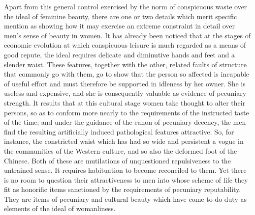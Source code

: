 \documentclass[12pt]{report}
\begin{document}
Apart from this general control exercised by the norm of conspicuous
waste over the ideal of feminine beauty, there are one or two details
which merit specific mention as showing how it may exercise an extreme
constraint in detail over men's sense of beauty in women. It has
already been noticed that at the stages of economic evolution at which
conspicuous leisure is much regarded as a means of good repute, the
ideal requires delicate and diminutive hands and feet and a slender
waist. These features, together with the other, related faults of
structure that commonly go with them, go to show that the person so
affected is incapable of useful effort and must therefore be supported
in idleness by her owner. She is useless and expensive, and she is
consequently valuable as evidence of pecuniary strength. It results that
at this cultural stage women take thought to alter their persons, so as
to conform more nearly to the requirements of the instructed taste of
the time; and under the guidance of the canon of pecuniary decency,
the men find the resulting artificially induced pathological features
attractive. So, for instance, the constricted waist which has had so
wide and persistent a vogue in the communities of the Western culture,
and so also the deformed foot of the Chinese. Both of these are
mutilations of unquestioned repulsiveness to the untrained sense. It
requires habituation to become reconciled to them. Yet there is no room
to question their attractiveness to men into whose scheme of life they
fit as honorific items sanctioned by the requirements of pecuniary
reputability. They are items of pecuniary and cultural beauty which have
come to do duty as elements of the ideal of womanliness.
\end{document}

